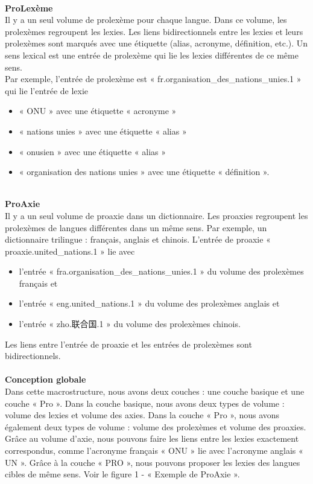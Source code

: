 \documentclass[10pt,a4paper,twoside]{article}
\newcommand{\Chinois}[1]{{\fontspec[Scale=0.9]{STSong}#1}}
\begin{document}
\\
\textbf{ProLexème}\\
Il y a un seul volume de prolexème pour chaque langue. Dans ce volume, les prolexèmes regroupent les lexies. Les liens bidirectionnels entre les lexies et leurs prolexèmes sont marqués avec une étiquette (alias, acronyme, définition, etc.). Un sens lexical est une entrée de prolexème qui lie les lexies différentes de ce même sens. \\
Par exemple, l’entrée de prolexème est « fr.organisation\_des\_nations\_unies.1 » qui lie l’entrée de lexie 
\begin{itemize}
\item « ONU » avec une étiquette « acronyme »
\item « nations unies » avec une étiquette « alias »
\item « onusien » avec une étiquette « alias »
\item « organisation des nations unies » avec une étiquette « définition ».
\end{itemize}
\quad  \\
\textbf{ProAxie}\\
Il y a un seul volume de proaxie dans un dictionnaire. Les proaxies regroupent les prolexèmes de langues différentes dans un même sens. Par exemple, un dictionnaire trilingue : français, anglais et chinois. L’entrée de proaxie « proaxie.united\_nations.1 » lie avec 
\begin{itemize}
\item l’entrée « fra.organisation\_des\_nations\_unies.1 » du volume des prolexèmes français et 
\item l’entrée « eng.united\_nations.1 » du volume des prolexèmes anglais et
\item l’entrée « zho.\Chinois{联合国}.1 » du volume des prolexèmes chinois.
\end{itemize}
Les liens entre l'entrée de proaxie et les entrées de prolexèmes sont bidirectionnels.\\
\\
\textbf{Conception globale}\\
Dans cette macrostructure, nous avons deux couches : une couche basique et une couche « Pro ».  Dans la couche basique, nous avons deux types de volume : volume des lexies et volume des axies. Dans la couche « Pro », nous avons également deux types de volume : volume des prolexèmes et volume des proaxies.
Grâce au volume d’axie, nous pouvons faire les liens entre les lexies exactement correspondus, comme l’acronyme français « ONU » lie avec l’acronyme anglais « UN ». Grâce à la couche « PRO »,  nous pouvons proposer les lexies des langues cibles de même sens.  Voir le figure 1 - « Exemple de ProAxie ».\\
\end{document}
